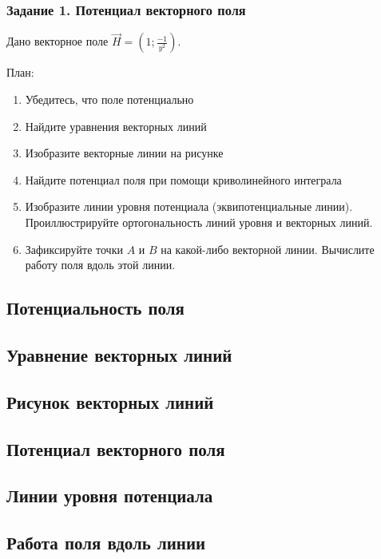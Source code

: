 \begin{frame}\frametitle{Задание 1. Потенциал векторного поля}
	Дано векторное поле \( \vec H = \left( 1; \frac{-1}{y^2} \right) \).

	План:
	\begin{enumerate}
		\item Убедитесь, что поле потенциально
		\item Найдите уравнения векторных линий
		\item Изобразите векторные линии на рисунке
		\item Найдите потенциал поля при помощи криволинейного интеграла
		\item Изобразите линии уровня потенциала (эквипотенциальные линии).
		      Проиллюстрируйте ортогональность линий уровня и векторных линий.
		\item Зафиксируйте точки \( A \) и \( B \) на какой-либо векторной линии.
		      Вычислите работу поля вдоль этой линии.
	\end{enumerate}
\end{frame}

\subsection{Потенциальность поля}

\subsection{Уравнение векторных линий}

\subsection{Рисунок векторных линий}

\subsection{Потенциал векторного поля}

\subsection{Линии уровня потенциала}

\subsection{Работа поля вдоль линии}

